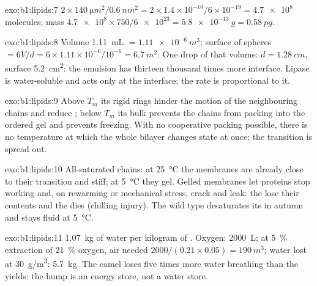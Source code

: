 \begin{solution}{exo:b1:lipids:7}
$2\times\qty{140}{\micro m^2}/\qty{0.6}{nm^2} = 2\times 1.4\times
10^{-10}/6\times 10^{-19} = \num{4.7e8}$ molecules; mass
$\num{4.7e8}\times 750/\num{6e23} = \qty{5.8e-13}{g} = \qty{0.58}{pg}$.
\end{solution}

\begin{solution}{exo:b1:lipids:8}
Volume \qty{1.11}{mL} $= \qty{1.11e-6}{m^3}$; surface of spheres
$= 6V/d = 6\times 1.11\times 10^{-6}/10^{-6} = \qty{6.7}{m^2}$. One
drop of that volume: $d = \qty{1.28}{cm}$, surface \qty{5.2}{cm^2}: the
emulsion has thirteen thousand times more interface. Lipase is
water-soluble and acts only at the interface; the rate is proportional
to it.
\end{solution}

\begin{solution}{exo:b1:lipids:9}
Above $T_m$ its rigid rings hinder the motion of the neighbouring
chains and reduce ; below $T_m$ its bulk prevents the chains
from packing into the ordered gel and prevents freezing. With no
cooperative packing possible, there is no temperature at which the
whole bilayer changes state at once: the transition is spread out.
\end{solution}

\begin{solution}{exo:b1:lipids:10}
All-saturated chains: at \qty{25}{\celsius} the membranes are already
close to their transition and stiff; at \qty{5}{\celsius} they gel.
Gelled membranes let proteins stop working and, on rewarming or
mechanical stress, crack and leak: the  lose their contents and
the  dies (chilling injury). The wild type desaturates its
 in autumn and stays fluid at \qty{5}{\celsius}.
\end{solution}

\begin{solution}{exo:b1:lipids:11}
\qty{1.07}{kg} of water per kilogram of . Oxygen: \qty{2000}{L};
at \qty{5}{\%} extraction of \qty{21}{\%} oxygen, air needed
$2000/(0.21\times 0.05) = \qty{190}{m^3}$; water lost at
\qty{30}{g/m^3}: \qty{5.7}{kg}. The camel loses five times more water
breathing than the  yields: the hump is an energy store, not a water
store.
\end{solution}

